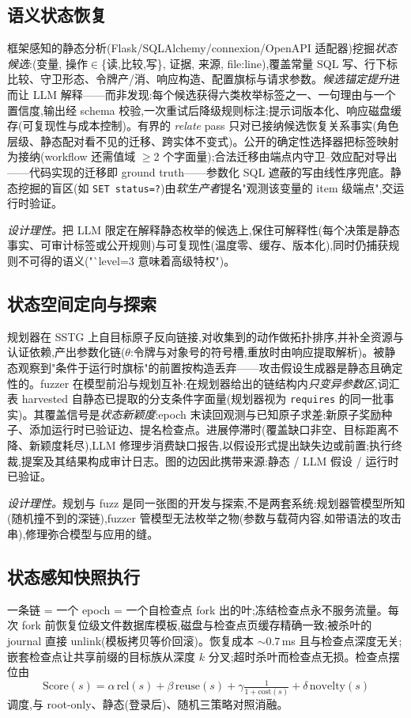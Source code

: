 \documentclass[letterpaper,twocolumn,10pt]{article}
\begin{document}
\subsection{语义状态恢复}
\label{sec:recovery}
框架感知的静态分析(Flask/SQLAlchemy/connexion/OpenAPI 适配器)挖掘\emph{状态候选}:(变量, 操作$\in$\{读,比较,写\}, 证据, 来源, file:line),覆盖常量 SQL 写、行下标比较、守卫形态、令牌产/消、响应构造、配置旗标与请求参数。\emph{候选锚定提升}进而让 LLM 解释——而非发现:每个候选获得六类枚举标签之一、一句理由与一个置信度,输出经 schema 校验,一次重试后降级规则标注;提示词版本化、响应磁盘缓存(可复现性与成本控制)。有界的 \emph{relate} pass 只对已接纳候选恢复关系事实(角色层级、静态配对看不见的迁移、跨实体不变式)。公开的确定性选择器把标签映射为接纳(workflow 还需值域 $\geq$2 个字面量);合法迁移由端点内守卫--效应配对导出——代码实现的迁移即 ground truth——参数化 SQL 遮蔽的写由线性序兜底。静态挖掘的盲区(如 \texttt{SET status=?})由\emph{软生产者}提名"观测该变量的 item 级端点",交运行时验证。

\emph{设计理性。}把 LLM 限定在解释静态枚举的候选上,保住可解释性(每个决策是静态事实、可审计标签或公开规则)与可复现性(温度零、缓存、版本化),同时仍捕获规则不可得的语义("`level=3 意味着高级特权")。

\subsection{状态空间定向与探索}
\label{sec:navigate}
规划器在 SSTG 上自目标原子反向链接,对收集到的动作做拓扑排序,并补全资源与认证依赖,产出参数化链($\theta$:令牌与对象号的符号槽,重放时由响应提取解析)。被静态观察到"条件于运行时旗标"的前置按构造丢弃——攻击假设生成器是静态且确定性的。fuzzer 在模型前沿与规划互补:在规划器给出的链结构内\emph{只变异参数区},词汇表 harvested 自静态已提取的分支条件字面量(规划器视为 \texttt{requires} 的同一批事实)。其覆盖信号是\emph{状态新颖度}:epoch 末读回观测与已知原子求差;新原子奖励种子、添加运行时已验证边、提名检查点。进展停滞时(覆盖缺口非空、目标距离不降、新颖度耗尽),LLM 修理步消费缺口报告,以假设形式提出缺失边或前置;执行终裁,提案及其结果构成审计日志。图的边因此携带来源:静态 / LLM 假设 / 运行时已验证。

\emph{设计理性。}规划与 fuzz 是同一张图的开发与探索,不是两套系统:规划器管模型所知(随机撞不到的深链),fuzzer 管模型无法枚举之物(参数与载荷内容,如带语法的攻击串),修理弥合模型与应用的缝。

\subsection{状态感知快照执行}
\label{sec:snapshot}
一条链 = 一个 epoch = 一个自检查点 fork 出的叶;冻结检查点永不服务流量。每次 fork 前恢复位级文件数据库模板,磁盘与检查点页缓存精确一致;被杀叶的 journal 直接 unlink(模板拷贝等价回滚)。恢复成本 ${\sim}0.7$\,ms 且与检查点深度无关;嵌套检查点让共享前缀的目标族从深度 $k$ 分叉;超时杀叶而检查点无损。检查点摆位由
\begin{equation}
\mathrm{Score}(s) = \alpha\,\mathrm{rel}(s) + \beta\,\mathrm{reuse}(s) + \gamma\tfrac{1}{1+\mathrm{cost}(s)} + \delta\,\mathrm{novelty}(s)
\end{equation}
调度,与 root-only、静态(登录后)、随机三策略对照消融。
\end{document}
